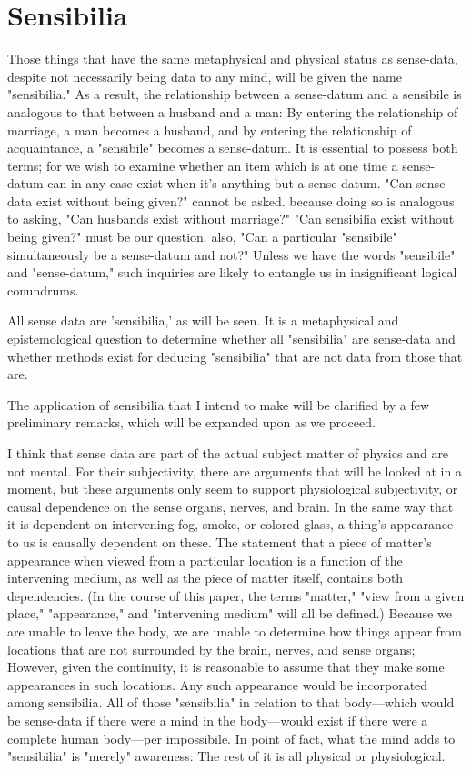 \documentclass[a4paper,12pt]{book}[2004/02/16]
\theoremstyle{ilemma}
\theoremstyle{itheorem}
\theoremstyle{iother}
\theoremstyle{icorollary}
\theoremstyle{numcorollary}
\theoremstyle{idefinition}
\begin{document}
\section{Sensibilia}
Those things that have the same metaphysical and physical status as sense-data, despite not necessarily being data to any mind, will be given the name "sensibilia." As a result, the relationship between a sense-datum and a sensibile is analogous to that between a husband and a man: By entering the relationship of marriage, a man becomes a husband, and by entering the relationship of acquaintance, a "sensibile" becomes a sense-datum. It is essential to possess both terms; for we wish to
examine whether an item which is at one time a sense-datum can in any case
exist when it's anything but a sense-datum. "Can sense-data exist without being given?" cannot be asked. because doing so is analogous to asking, "Can husbands exist without marriage?" "Can sensibilia exist without being given?" must be our question. also, "Can a particular "sensibile" simultaneously be a sense-datum and not?" Unless we have the words "sensibile" and "sense-datum," such inquiries are likely to entangle us in insignificant logical conundrums.

All sense data are 'sensibilia,' as will be seen. It is a metaphysical and epistemological question to determine whether all "sensibilia" are sense-data and whether methods exist for deducing "sensibilia" that are not data from those that are.

The application of sensibilia that I intend to make will be clarified by a few preliminary remarks, which will be expanded upon as we proceed.

I think that sense data are part of the actual subject matter of physics and are not mental. For their subjectivity, there are arguments that will be looked at in a moment, but these arguments only seem to support physiological subjectivity, or causal dependence on the sense organs, nerves, and brain. In the same way that it is dependent on intervening fog, smoke, or colored glass, a thing's appearance to us is causally dependent on these. The statement that a piece of matter's appearance when viewed from a particular location is a function of the intervening medium, as well as the piece of matter itself, contains both dependencies.
(In the course of this paper, the terms "matter," "view from a given place," "appearance," and "intervening medium" will all be defined.) Because we are unable to leave the body, we are unable to determine how things appear from locations that are not surrounded by the brain, nerves, and sense organs; However, given the continuity, it is reasonable to assume that they make some appearances in such locations. Any such appearance would be incorporated among sensibilia.
All of those "sensibilia" in relation to that body—which would be sense-data if there were a mind in the body—would exist if there were a complete human body—per impossibile. In point of fact, what the mind adds to "sensibilia" is "merely" awareness:
The rest of it is all physical or physiological.
\end{document}
